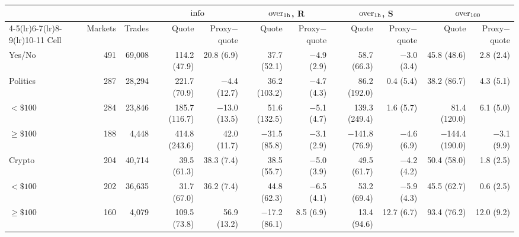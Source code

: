 \begin{tabular}{lrrrrrrrrrr}
\toprule
 & & & \multicolumn{2}{c}{$\mathrm{info}$} & \multicolumn{2}{c}{$\mathrm{over}_{1\mathrm h}$, R} & \multicolumn{2}{c}{$\mathrm{over}_{1\mathrm h}$, S} & \multicolumn{2}{c}{$\mathrm{over}_{100}$} \\
\cmidrule(lr){4-5}\cmidrule(lr){6-7}\cmidrule(lr){8-9}\cmidrule(lr){10-11}
Cell & Markets & Trades & Quote & Proxy$-$quote & Quote & Proxy$-$quote & Quote & Proxy$-$quote & Quote & Proxy$-$quote \\
\midrule
Yes/No & 491 & 69,008 & 114.2 (47.9) & 20.8 (6.9) & 37.7 (52.1) & \ensuremath{-}4.9 (2.9) & 58.7 (66.3) & \ensuremath{-}3.0 (3.4) & 45.8 (48.6) & 2.8 (2.4) \\
Politics & 287 & 28,294 & 221.7 (70.9) & \ensuremath{-}4.4 (12.7) & 36.2 (103.2) & \ensuremath{-}4.7 (4.3) & 86.2 (192.0) & 0.4 (5.4) & 38.2 (86.7) & 4.3 (5.1) \\
\quad $<\$100$ & 284 & 23,846 & 185.7 (116.7) & \ensuremath{-}13.0 (13.5) & 51.6 (132.5) & \ensuremath{-}5.1 (4.7) & 139.3 (249.4) & 1.6 (5.7) & 81.4 (120.0) & 6.1 (5.0) \\
\quad $\ge\$100$ & 188 & 4,448 & 414.8 (243.6) & 42.0 (11.7) & \ensuremath{-}31.5 (85.8) & \ensuremath{-}3.1 (2.9) & \ensuremath{-}141.8 (76.9) & \ensuremath{-}4.6 (6.9) & \ensuremath{-}144.4 (190.0) & \ensuremath{-}3.1 (9.9) \\
Crypto & 204 & 40,714 & 39.5 (61.3) & 38.3 (7.4) & 38.5 (55.7) & \ensuremath{-}5.0 (3.9) & 49.5 (61.7) & \ensuremath{-}4.2 (4.2) & 50.4 (58.0) & 1.8 (2.5) \\
\quad $<\$100$ & 202 & 36,635 & 31.7 (67.0) & 36.2 (7.4) & 44.8 (62.3) & \ensuremath{-}6.5 (4.1) & 53.2 (69.4) & \ensuremath{-}5.9 (4.3) & 45.5 (62.7) & 0.6 (2.5) \\
\quad $\ge\$100$ & 160 & 4,079 & 109.5 (73.8) & 56.9 (13.2) & \ensuremath{-}17.2 (86.1) & 8.5 (6.9) & 13.4 (94.6) & 12.7 (6.7) & 93.4 (76.2) & 12.0 (9.2) \\
\bottomrule
\end{tabular}
